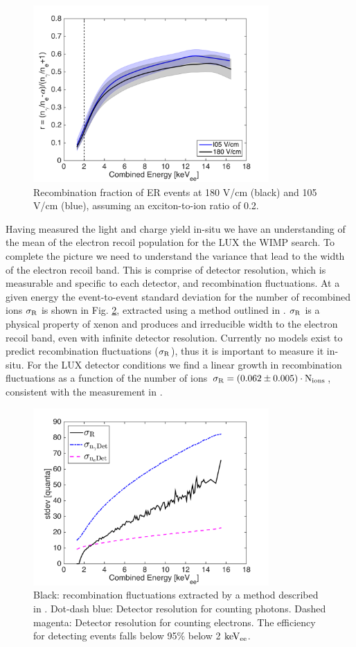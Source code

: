 \begin{figure}[h!]\centering
\includegraphics[width=90mm]{fig/recombination.png}
\caption{Recombination fraction of ER events at 180 V/cm (black) and 105 V/cm (blue), assuming an exciton-to-ion ratio of 0.2.}
\label{fig:recombination}
\end{figure}

Having measured the light and charge yield in-situ we have an understanding of the mean of the electron recoil population for the LUX the WIMP search. To complete the picture we need to understand the variance that lead to the width of the electron recoil band. This is comprise of detector resolution, which is measurable and specific to each detector, and recombination fluctuations. At a given energy the event-to-event standard deviation for the number of recombined ions $\rm \sigma_R$ is shown in Fig. \ref{fig:recomb-flucs}, extracted using a method outlined in \cite{Dobi_Thesis}. $\rm \sigma_R$ is a physical property of xenon and produces and irreducible width to the electron recoil band, even with infinite detector resolution. Currently no models exist to predict recombination fluctuations ($\rm \sigma_R$), thus it is important to measure it in-situ. For the LUX detector conditions we find a linear growth in recombination fluctuations as a function of the number of ions $\rm \sigma_R = (0.062 \pm 0.005)\cdot N_{ions}$, consistent with the measurement in \cite{Dobi_Thesis}.

\begin{figure}[h!]\centering
\includegraphics[width=90mm]{fig/recomb_flucs.png}
\caption{Black: recombination fluctuations extracted by a method described in \cite{Dobi_Thesis}. Dot-dash blue: Detector resolution for counting photons. Dashed magenta: Detector resolution for counting electrons. The efficiency for detecting events falls below 95\% below 2 $\rm keV_{ee}$.}
\label{fig:recomb-flucs}
\end{figure}

